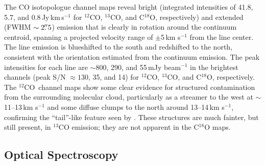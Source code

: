 \documentclass[twocolumn]{aastex61}
\newcommand{\twelve}{${}^{12}$CO}
\newcommand{\thirteen}{${}^{13}$CO}
\newcommand{\eighteen}{C${}^{18}$O}
\begin{document}
The CO isotopologue channel maps reveal bright (integrated intensities of 41.8, 5.7, and 0.8\,Jy\,km\,s$^{-1}$ for $^{12}$CO, $^{13}$CO, and C$^{18}$O, respectively) and extended (FWHM $\sim 2\mbox{$.\!\!^{\prime\prime}$}5$) emission that is clearly in rotation around the continuum centroid, spanning a projected velocity range of $\pm$5\,km s$^{-1}$ from the line center.  The line emission is blueshifted to the south and redshifted to the north, consistent with the orientation estimated from the continuum emission. The peak intensities for each line are $\sim$800, 290, and 55\,mJy beam$^{-1}$ in the brightest channels (peak S/N $\approx 130$, 35, and 14) for \twelve, \thirteen, and \eighteen, respectively. The \twelve\ channel maps show some clear evidence for structured contamination from the surrounding molecular cloud, particularly as a streamer to the west at $\sim$11--13\,km s$^{-1}$ and some diffuse clumps to the north around 13--14\,km s$^{-1}$, confirming the ``tail''-like feature seen by \citet{fang17}.  These structures are much fainter, but still present, in $^{13}$CO emission; they are not apparent in the C$^{18}$O maps.



\subsection{Optical Spectroscopy \label{subsec:spectroscopy}}
\end{document}
